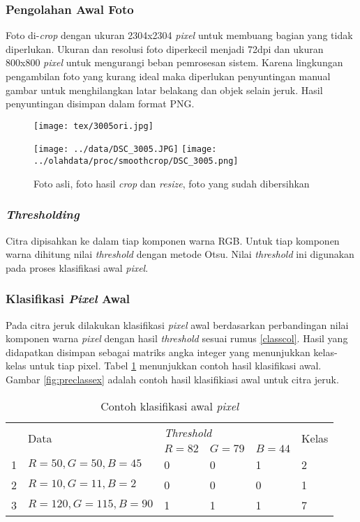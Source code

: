 \documentclass[laporan.tex]{subfiles}
\begin{document}
\subsubsection{Pengolahan Awal Foto}

Foto di-\emph{crop} dengan ukuran 2304x2304 \emph{pixel} untuk membuang bagian yang tidak diperlukan. Ukuran dan resolusi foto diperkecil menjadi 72dpi dan ukuran 800x800 \emph{pixel} untuk mengurangi beban pemrosesan sistem. Karena lingkungan pengambilan foto yang kurang ideal maka diperlukan penyuntingan manual gambar untuk menghilangkan latar belakang dan objek selain jeruk. Hasil penyuntingan disimpan dalam format PNG.

\begin{figure}[h]
\centering
\texttt{[image: tex/3005ori.jpg]}

\vskip 1cm
\texttt{[image: ../data/DSC\_3005.JPG]} \qquad
\texttt{[image: ../olahdata/proc/smoothcrop/DSC\_3005.png]}
\caption{Foto asli, foto hasil \emph{crop} dan \emph{resize}, foto yang sudah dibersihkan}
\end{figure}

\subsubsection{\emph{Thresholding}}

Citra dipisahkan ke dalam tiap komponen warna RGB. Untuk tiap komponen warna dihitung nilai \emph{threshold} dengan metode Otsu. Nilai \emph{threshold} ini digunakan pada proses klasifikasi awal \emph{pixel}.


\subsubsection{Klasifikasi \emph{Pixel} Awal}

Pada citra jeruk dilakukan klasifikasi \emph{pixel} awal berdasarkan perbandingan nilai komponen warna \emph{pixel} dengan hasil \emph{threshold} sesuai rumus \ref{classcol}. Hasil yang didapatkan disimpan sebagai matriks angka integer yang menunjukkan kelas-kelas untuk tiap pixel. Tabel \ref{table:preclass3} menunjukkan contoh hasil klasifikasi awal. Gambar \ref{fig:preclassex} adalah contoh hasil klasifikiasi awal untuk citra jeruk.

\begin{table}[h]
\centering
\begin{tabular}{|l|l|l|l|l|l|}
\cline{1-6}
\multirow{2}{*}{} & \multirow{2}{*}{Data} & \multicolumn{3}{l|}{\emph{Threshold}} & \multirow{2}{*}{Kelas} \\
\cline{3-5}
 & & $R=82$ & $G=79$ & $B=44$ & \\
\cline{1-6}
1 & $R=50, G=50, B=45$ & 0 & 0 & 1 & 2 \\
2 & $R=10, G=11, B=2$ & 0 & 0 & 0 & 1 \\
3 & $R=120, G=115, B=90$ & 1 & 1 & 1 & 7 \\
\cline{1-6}
\end{tabular}
\caption{Contoh klasifikasi awal \emph{pixel}}
\label{table:preclass3}
\end{table}
\end{document}
